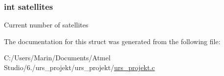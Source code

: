 \subsubsection[{satellites}]{\setlength{\rightskip}{0pt plus 5cm}int satellites}\label{struct_previous_gps_reading_a691915f3fb4792e167a2351c6e932483}
Current number of satellites 

The documentation for this struct was generated from the following file\+:\begin{DoxyCompactItemize}
\item 
C\+:/\+Users/\+Marin/\+Documents/\+Atmel Studio/6./urs\+\_\+projekt/urs\+\_\+projekt/\hyperlink{urs__projekt_8c}{urs\+\_\+projekt.\+c}\end{DoxyCompactItemize}
